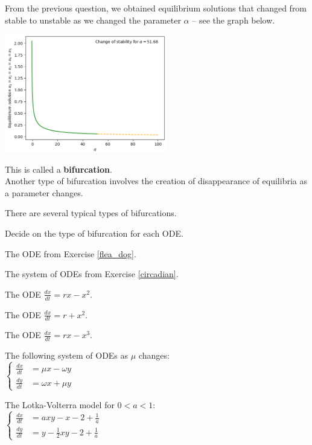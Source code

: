 

\begin{slide}
\question

From the previous question, we obtained equilibrium solutions that changed from stable to unstable as we changed the parameter $\alpha$ -- see the graph below.
	\begin{center}
		\includegraphics[width=200pt]{images/circadian5.png}
	\end{center}

This is called a \textbf{bifurcation}. \\


Another type of bifurcation involves the creation of disappearance of equilibria as a parameter changes.

There are several typical types of bifurcations.

\end{slide}


\begin{slide}


Decide on the type of bifurcation for each ODE.

\begin{parts}
	\item The ODE from Exercise \ref{flea_dog}.
	\item The system of ODEs from Exercise \ref{circadian}.
	\item The ODE $\frac{dx}{dt} = rx - x^2$.
	\item The ODE $\frac{dx}{dt} = r + x^2$.
	\item The ODE $\frac{dx}{dt} = rx - x^3$.
	\item The following system of ODEs as $\mu$ changes: \\
	$ \begin{cases}
 		\frac{dx}{dt} & = \mu x -  \omega y \\[5pt]
 		\frac{dy}{dt} & = \omega x + \mu y
	\end{cases}
	$
	\item The Lotka-Volterra model for $0< a < 1$: \\
	$ \begin{cases}
 		\frac{dx}{dt} & = a xy - x - 2 + \frac1a\\[5pt]
 		\frac{dy}{dt} & = y - \frac12 xy - 2 + \frac1a
	\end{cases}
	$
\end{parts}
	
	
\end{slide}


